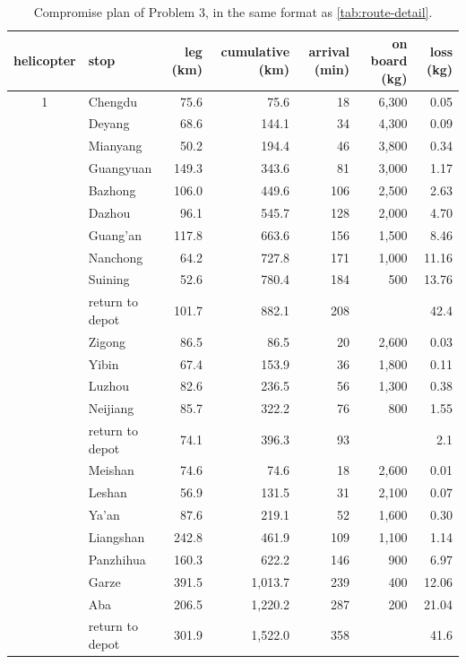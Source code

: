 \documentclass[11pt,a4paper]{article}
\theoremstyle{definition}
\begin{document}
\begin{table}[H]
\centering
\caption{Compromise plan of Problem 3, in the same format as \cref{tab:route-detail}.}\label{tab:compromise-detail}
\small\setlength{\tabcolsep}{5pt}
\begin{tabular}{clrrrrr}
\toprule
helicopter & stop & leg (km) & cumulative (km) & arrival (min) & on board (kg) & loss (kg) \\
\midrule
1 & Chengdu & 75.6 & 75.6 & 18 & 6{,}300 & 0.05 \\
 & Deyang & 68.6 & 144.1 & 34 & 4{,}300 & 0.09 \\
 & Mianyang & 50.2 & 194.4 & 46 & 3{,}800 & 0.34 \\
 & Guangyuan & 149.3 & 343.6 & 81 & 3{,}000 & 1.17 \\
 & Bazhong & 106.0 & 449.6 & 106 & 2{,}500 & 2.63 \\
 & Dazhou & 96.1 & 545.7 & 128 & 2{,}000 & 4.70 \\
 & Guang'an & 117.8 & 663.6 & 156 & 1{,}500 & 8.46 \\
 & Nanchong & 64.2 & 727.8 & 171 & 1{,}000 & 11.16 \\
 & Suining & 52.6 & 780.4 & 184 & 500 & 13.76 \\
 & return to depot & 101.7 & 882.1 & 208 & & 42.4 \\
\addlinespace
2 & Zigong & 86.5 & 86.5 & 20 & 2{,}600 & 0.03 \\
 & Yibin & 67.4 & 153.9 & 36 & 1{,}800 & 0.11 \\
 & Luzhou & 82.6 & 236.5 & 56 & 1{,}300 & 0.38 \\
 & Neijiang & 85.7 & 322.2 & 76 & 800 & 1.55 \\
 & return to depot & 74.1 & 396.3 & 93 & & 2.1 \\
\addlinespace
3 & Meishan & 74.6 & 74.6 & 18 & 2{,}600 & 0.01 \\
 & Leshan & 56.9 & 131.5 & 31 & 2{,}100 & 0.07 \\
 & Ya'an & 87.6 & 219.1 & 52 & 1{,}600 & 0.30 \\
 & Liangshan & 242.8 & 461.9 & 109 & 1{,}100 & 1.14 \\
 & Panzhihua & 160.3 & 622.2 & 146 & 900 & 6.97 \\
 & Garze & 391.5 & 1{,}013.7 & 239 & 400 & 12.06 \\
 & Aba & 206.5 & 1{,}220.2 & 287 & 200 & 21.04 \\
 & return to depot & 301.9 & 1{,}522.0 & 358 & & 41.6 \\
\bottomrule
\end{tabular}
\end{table}
\end{document}

